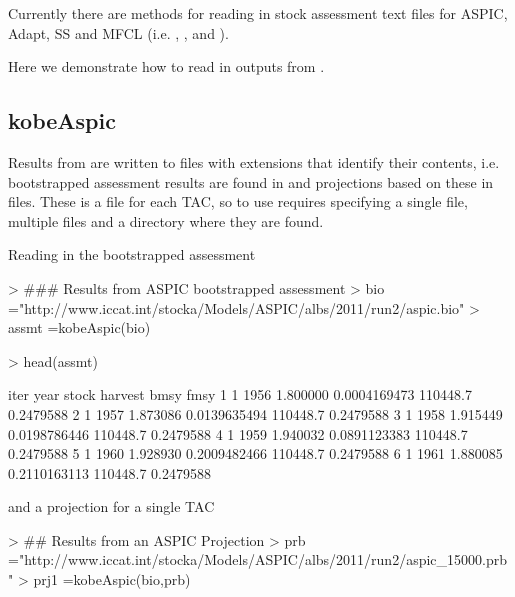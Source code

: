 \documentclass[shortnames,nojss,article]{jss}
\begin{document}
Currently there are methods for reading in stock assessment text files for ASPIC, Adapt, SS and MFCL (i.e. , , 
 and ). 

Here we demonstrate how to read in outputs from .

\subsection{kobeAspic}

Results from  are written to files with extensions that identify their contents, i.e.
bootstrapped assessment results are found in  and projections based on these in  files. 
These is a  file for each TAC, so to use  requires 
specifying a single  file, multiple  files and a directory where they are found. 

Reading in the bootstrapped assessment

\begin{Schunk}
\begin{Sinput}
> ### Results from ASPIC bootstrapped assessment
> bio   ="http://www.iccat.int/stocka/Models/ASPIC/albs/2011/run2/aspic.bio"
> assmt =kobeAspic(bio)
\end{Sinput}
\end{Schunk}
\begin{Schunk}
\begin{Sinput}
> head(assmt)
\end{Sinput}
\begin{Soutput}
  iter year    stock      harvest     bmsy      fmsy
1    1 1956 1.800000 0.0004169473 110448.7 0.2479588
2    1 1957 1.873086 0.0139635494 110448.7 0.2479588
3    1 1958 1.915449 0.0198786446 110448.7 0.2479588
4    1 1959 1.940032 0.0891123383 110448.7 0.2479588
5    1 1960 1.928930 0.2009482466 110448.7 0.2479588
6    1 1961 1.880085 0.2110163113 110448.7 0.2479588
\end{Soutput}
\end{Schunk}

and a projection for a single TAC 

\begin{Schunk}
\begin{Sinput}
> ## Results from an ASPIC Projection
> prb  ="http://www.iccat.int/stocka/Models/ASPIC/albs/2011/run2/aspic_15000.prb"
> prj1 =kobeAspic(bio,prb)
\end{Sinput}
\end{Schunk}
\end{document}
